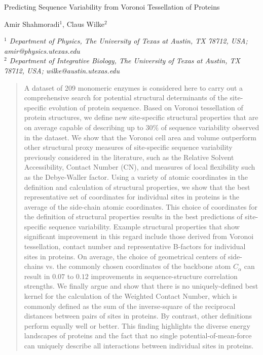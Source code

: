 \documentclass[11pt]{article}
\makeatletter
\newcommand\pubnumber{}
\newcommand\pubdate{\today}
\def\affiliation{$^1$ Department of Physics, The University of Texas at Austin, TX 78712, USA; amir@physics.utexas.edu \\
                 $^2$ Department of Integrative Biology, The University of Texas at Austin, TX 78712, USA; wilke@austin.utexas.edu
                 }
\def\Title#1{\begin{center} {\Large #1 } \end{center}}
\def\Author#1{\begin{center}{ \sc #1} \end{center}}
\def\Address#1{\begin{center}{ \it #1} \end{center}}
\newcommand\pubblock{\rightline{\begin{tabular}{l} \pubnumber\\
         \pubdate  \end{tabular}}}
\newenvironment{Abstract}{\begin{quotation}  }{\end{quotation}}
\makeatother
\begin{document}
\begin{titlepage}
\pubblock

\vfill
\Title{Predicting Sequence Variability from Voronoi Tessellation of Proteins}
\vfill
\Author{Amir Shahmoradi$^{1}$, Claus Wilke$^2$}
\Address{\affiliation}
\vfill
\begin{Abstract}
    A dataset of 209 monomeric enzymes is considered here to carry out a comprehensive search for potential structural determinants of the site-specific evolution of protein sequence. Based on Voronoi tessellation of protein structures, we define new site-specific structural properties that are on average capable of describing up to $30\%$ of sequence variability observed in the dataset. We show that the Voronoi cell area and volume outperform other structural proxy measures of site-specific sequence variability previously considered in the literature, such as the Relative Solvent Accessibility, Contact Number (CN), and measures of local flexibility such as the Debye-Waller factor.  Using a variety of atomic coordinates in the definition and calculation of structural properties, we show that the best representative set of coordinates for individual sites in proteins is the average of the side-chain atomic coordinates. This choice of coordinates for the definition of structural properties results in the best predictions of site-specific sequence variability. Example structural properties that show significant improvement in this regard include those derived from Voronoi tessellation, contact number and representative B-factors for individual sites in proteins. On average, the choice of geometrical centers of side-chains vs. the commonly chosen coordinates of the backbone atom $C_\alpha$ can result in $0.07$ to $0.12$ improvements in sequence-structure correlation strengths. We finally argue and show that there is no uniquely-defined best kernel for the calculation of the Weighted Contact Number, which is commonly defined as the sum of the inverse-square of the reciprocal distances between pairs of sites in proteins. By contrast, other definitions perform equally well or better.  This finding highlights the diverse energy landscapes of proteins and the fact that no single potential-of-mean-force can uniquely describe all interactions between individual sites in proteins.
    

\end{Abstract}
\end{titlepage}
\end{document}
